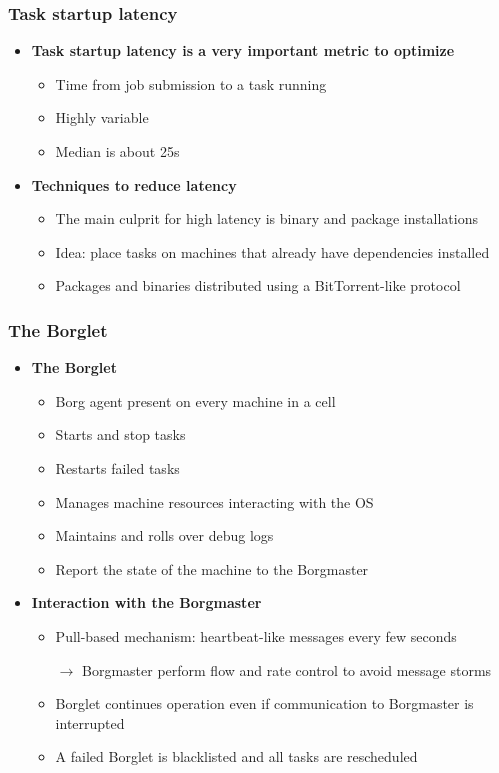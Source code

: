 \begin{frame}
\frametitle{Task startup latency}
\begin{itemize}
	\item {\bf Task startup latency is a very important metric to optimize}
	\begin{itemize}
		\item Time from job submission to a task running
		\item Highly variable
		\item Median is about 25s
	\end{itemize}

\vspace{20pt}

	\item {\bf Techniques to reduce latency}
	\begin{itemize}
		\item The main culprit for high latency is binary and package installations
		\item Idea: place tasks on machines that already have dependencies installed
		\item Packages and binaries distributed using a BitTorrent-like protocol
	\end{itemize}
\end{itemize}
\end{frame}

\begin{frame}
\frametitle{The Borglet}
\begin{itemize}
	\item {\bf The Borglet}
	\begin{itemize}
		\item Borg agent present on every machine in a cell
		\item Starts and stop tasks
		\item Restarts failed tasks
		\item Manages machine resources interacting with the OS
		\item Maintains and rolls over debug logs
		\item Report the state of the machine to the Borgmaster
	\end{itemize}

\vspace{20pt}

	\item {\bf Interaction with the Borgmaster}
	\begin{itemize}
		\item Pull-based mechanism: heartbeat-like messages every few seconds
		\item[$\to$] Borgmaster perform flow and rate control to avoid message storms
		\item Borglet continues operation even if communication to Borgmaster is interrupted
		\item A failed Borglet is blacklisted and all tasks are rescheduled
	\end{itemize}
\end{itemize}
\end{frame}


